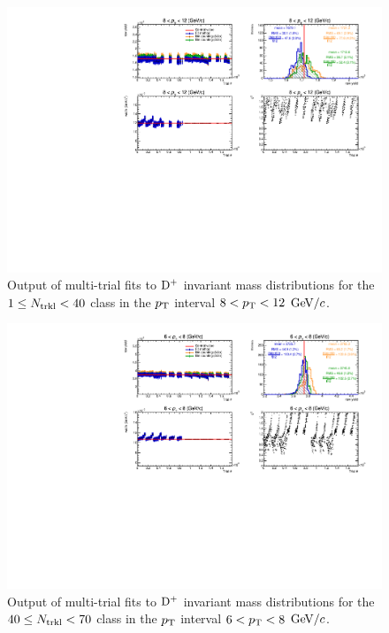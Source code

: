  \begin{figure}[htpb]
\centering
 \includegraphics[width=.9\textwidth]{FigCap6/RawYieldsSyst_Central_d0cut_Ntrklts_1_39_pt3.pdf}
 \caption{Output of multi-trial fits to ${\rm D^+}$ invariant mass distributions for the $1 \leq N_{\rm trkl} < 40$ class in the $p_{\rm T}$ interval $ 8 < p_{\rm T} < 12$ $\mathrm{GeV}/c$.}
 \label{fig:DplusMultiTrial_1}
\end{figure}

 \begin{figure}[htpb]
\centering
 \includegraphics[width=.9\textwidth]{FigCap6/RawYieldsSyst_Central_d0cut_Ntrklts_40_69_pt2.pdf}
 \caption{Output of multi-trial fits to ${\rm D^+}$ invariant mass distributions for the $40 \leq N_{\rm trkl} < 70$ class in the $p_{\rm T}$ interval $ 6 < p_{\rm T} < 8$ $\mathrm{GeV}/c$.}
 \label{fig:DplusMultiTrial_2}
\end{figure}

